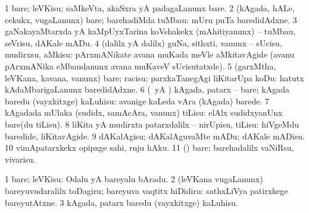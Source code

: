 \begin{center}
\noindent
\gl{\sakirx}
\bmng
\bnum
\num{1} bare; leVKisu; saMkeVta, akaSxra yA padagaLanunx bare. 
\num{2} (kAgada, hALe, cekukx, \mo vugaLanunx) bare; barehadiMda tuMbau:  mUru puTa baredidAdxne. 
\num{3} gaNakayaMtarxda yA kaMpUyxTarina koVshakekx (mAhitiyanunx) -- tuMbau, seVrisu, dAKale mADu. 
\num{4} (\kaparx dalilx yA \BUkaq dalilx) guNa, sithxti, \mo vanunx -- sUcisu, mudirxsu, aMkisu:  pArxmANikate avana muKada meVle aMkitavAgide (avanu pArxmANika eMbaudanunx avana muKaveV sUcisutatxde). 
\num{5} (garxMtha, leVKana, kavana, \mo vanunx) bare; racisu; parxkaTanegAgi liKitarUpa koDu:  hatutx kAdaMbarigaLanunx baredidAdxne. 
\num{6} (\ame\ yA \AmA) kAgada, patarx -- bare; kAgada baredu (vayxkitxge) kaLuhisu:  avanige kaLeda vAra (kAgada) barede. 
\num{7} kAgadada mUlaka (sudidx, samAcAra, \mo vanunx) tiLisu:  elAlx sudidxyanUnx bare(du tiLisu). 
\num{8} liKita yA mudirxta patarxdalilx -- nirUpisu, tiLisu:  hiVgeMdu baredide, liKitavAgide. 
\num{9} dAKalAgisu; dAKalAguvaMte mADu; dAKale mADisu. 
\num{10} vimApatarxkekx opipxge sahi, ruju hAku. 
\num{11} (\pArxparx) bare; barehadalilx vaNiRsu, vivarisu. 
\enum
\emng

\noindent
\gl{\akirx}
\expl{}
\bmng
\bnum
\num{1} bare; leVKisu:  Odalu yA bareyalu bAradu. 
\num{2} (leVKana \mo vugaLanunx) bareyuvudaralilx toDagiru; bareyuva vaqtitx hiDidiru:  sathxLiVya patirxkege bareyutAtxne. 
\num{3} kAgada, patarx baredu (vayxkitxge) kaLuhisu. 
\enum
\emng


\end{center}
